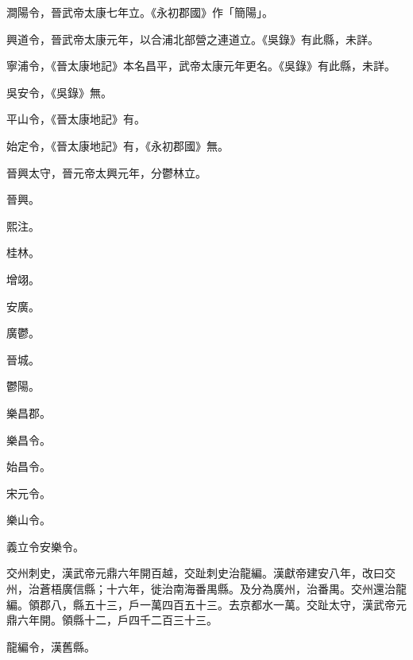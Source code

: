 \begin{pinyinscope}
 澗陽令，晉武帝太康七年立。《永初郡國》作「簡陽」。



 興道令，晉武帝太康元年，以合浦北部營之連道立。《吳錄》有此縣，未詳。



 寧浦令，《晉太康地記》本名昌平，武帝太康元年更名。《吳錄》有此縣，未詳。



 吳安令，《吳錄》無。



 平山令，《晉太康地記》有。



 始定令，《晉太康地記》有，《永初郡國》無。



 晉興太守，晉元帝太興元年，分鬱林立。



 晉興。



 熙注。



 桂林。



 增翊。



 安廣。



 廣鬱。



 晉城。



 鬱陽。



 樂昌郡。



 樂昌令。



 始昌令。



 宋元令。



 樂山令。



 義立令安樂令。



 交州刺史，漢武帝元鼎六年開百越，交趾刺史治龍編。漢獻帝建安八年，改曰交州，治蒼梧廣信縣；十六年，徙治南海番禺縣。及分為廣州，治番禺。交州還治龍編。領郡八，縣五十三，戶一萬四百五十三。去京都水一萬。交趾太守，漢武帝元鼎六年開。領縣十二，戶四千二百三十三。



 龍編令，漢舊縣。




\end{pinyinscope}
